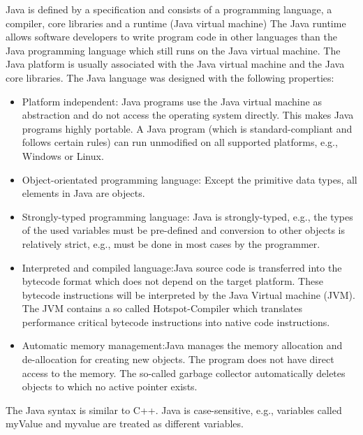 Java is defined by a specification and consists of a programming language, a compiler, core libraries and a runtime (Java virtual machine) The Java runtime allows software developers to write program code in other languages than the Java programming language which still runs on the Java virtual machine. The Java platform is usually associated with the Java virtual machine and the Java core libraries.
\newline
The Java language was designed with the following properties:
\begin{itemize}
    \item Platform independent: \newline Java programs use the Java virtual machine as abstraction and do not access the operating system directly. This makes Java programs highly portable. A Java program (which is standard-compliant and follows certain rules) can run unmodified on all supported platforms, e.g., Windows or Linux.

\item    Object-orientated programming language: \newline Except the primitive data types, all elements in Java are objects.

\item    Strongly-typed programming language: \newline Java is strongly-typed, e.g., the types of the used variables must be pre-defined and conversion to other objects is relatively strict, e.g., must be done in most cases by the programmer.

   \item Interpreted and compiled language:\newline Java source code is transferred into the bytecode format which does not depend on the target platform. These bytecode instructions will be interpreted by the Java Virtual machine (JVM). The JVM contains a so called Hotspot-Compiler which translates performance critical bytecode instructions into native code instructions.

    \item Automatic memory management:\newline Java manages the memory allocation and de-allocation for creating new objects. The program does not have direct access to the memory. The so-called garbage collector automatically deletes objects to which no active pointer exists.
\end{itemize}
The Java syntax is similar to C++. Java is case-sensitive, e.g., variables called myValue and myvalue are treated as different variables.

